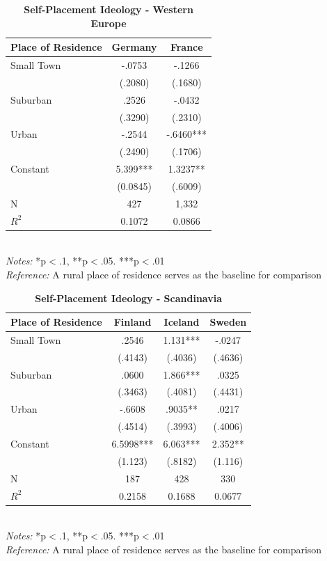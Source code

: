 \documentclass[12pt, titlepage]{article}
\newcommand\e{\emph}
\newcommand\tb{\textbf}
\begin{document}
\begin{singlespace}
\begin{table}[H]
		\centering
		\caption{\tb{Self-Placement Ideology - Western Europe}}
		\begin{tabulary}{\linewidth}{l c c }
			\\
			\hline
			\tb{Place of Residence}&\tb{Germany}&\tb{France} \\
			\hline
			Small Town   & -.0753 &-.1266  \\      
			& (.2080)  & (.1680)   \\
			Suburban   & .2526 & -.0432    \\ 
			 & (.3290)  & (.2310)    \\
			Urban   & -.2544 & -.6460***    \\
			 &(.2490)  & (.1706)   \\
			Constant  & 5.399***  & 1.3237** \\
			&(0.0845)&(.6009) \\
			N  &427  & 1,332    \\
			$R^2$  &0.1072 &0.0866  \\
			\hline                                       
		\end{tabulary} 
		\\
		\e{Notes:} *p$<$.1, **p$<$.05. ***p$<$.01 \\
		\e{Reference:} A rural place of residence serves as the baseline for comparison
		\label{table5}
\end{table}
\end{singlespace}

\begin{singlespace}
	\begin{table}[H]
		\centering
		\caption{\tb{Self-Placement Ideology - Scandinavia}}
		\begin{tabulary}{\linewidth}{l c c c}
			\\
			\hline
			\tb{Place of Residence}&\tb{Finland}&\tb{Iceland}&\tb{Sweden} \\
			\hline
			Small Town&.2546&1.131***&-.0247 \\
			&(.4143)&(.4036)&(.4636) \\
			Suburban&.0600&1.866***&.0325 \\
			&(.3463)&(.4081)&(.4431) \\
			Urban&-.6608&.9035**& .0217\\
			&(.4514)&(.3993)&(.4006) \\
			Constant&6.5998***&6.063***&2.352** \\
			&(1.123)&(.8182)&(1.116) \\
			N&187&428&330\\
			$R^2$&0.2158&0.1688&0.0677 \\
			\hline
		\end{tabulary}
		\\
		\e{Notes:} *p$<$.1, **p$<$.05. ***p$<$.01 \\
		\e{Reference:} A rural place of residence serves as the baseline for comparison
		\label{table6}
	\end{table}
\end{singlespace}
\end{document}
